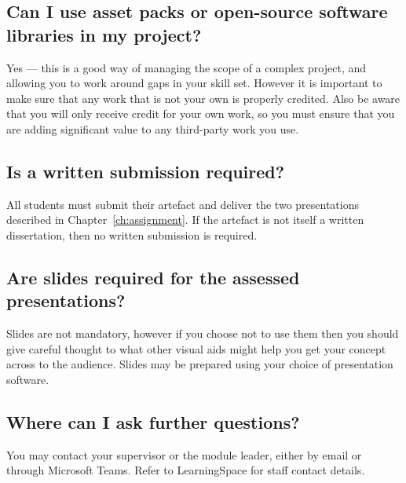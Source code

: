 \subsection*{Can I use asset packs or open-source software libraries in my project?}

Yes --- this is a good way of managing the scope of a complex project, and allowing you to work around gaps in your skill set.
However it is important to make sure that any work that is not your own is properly credited.
Also be aware that you will only receive credit for your own work, so you must ensure that you are adding significant value to any third-party work you use.

\subsection*{Is a written submission required?}

All students must submit their artefact and deliver the two presentations described in Chapter~\ref{ch:assignment}.
If the artefact is not itself a written dissertation, then no written submission is required.

\subsection*{Are slides required for the assessed presentations?}

Slides are not mandatory, however if you choose not to use them then you should give careful thought to what other visual aids might help you get your concept across to the audience.
Slides may be prepared using your choice of presentation software.

\subsection*{Where can I ask further questions?}

You may contact your supervisor or the module leader, either by email or through Microsoft Teams. Refer to LearningSpace for staff contact details.

